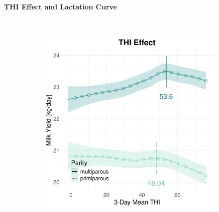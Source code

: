 \paragraph{THI Effect and Lactation Curve} \quad \\
\begin{figure}[H]
    \centering
    \begin{subfigure}[b]{0.45\textwidth}
        \centering
        \includegraphics[width=\textwidth]{thesis/figures/models/milk/full/bs_milk_full/bs_milk_full_marginal_thi_milk_combined.png}
    \end{subfigure}
    \hspace{0.05\textwidth} %
    \begin{subfigure}[b]{0.45\textwidth}
        \centering

\end{subfigure}
\end{figure}
